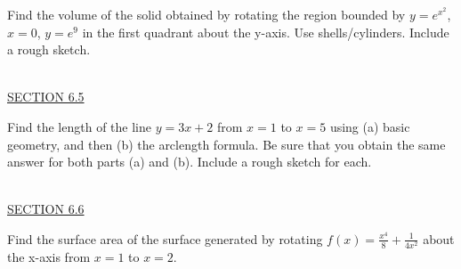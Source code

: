 \documentclass{exam}
\begin{document}
\begin{questions}
\question Find the volume of the solid obtained by rotating the region bounded by $y=e^{x^2}$, $x=0$, $y = e^{9}$ in the first quadrant about the y-axis.  Use shells/cylinders.   Include a rough sketch.

\ \\
\underline{SECTION 6.5} 

\question Find the length of the line $y=3x+2$ from $x=1$ to $x=5$ using (a) basic geometry, and then (b) the arclength formula.  Be sure that you obtain the same answer for both parts (a) and (b).   Include a rough sketch for each.

\ \\
\underline{SECTION 6.6} 

\question Find the surface area of the surface generated by rotating $f(x) = \frac{x^4}{8} + \frac{1}{4x^2}$ about the x-axis from $x=1$ to $x=2$.


\end{questions}
\end{document}
